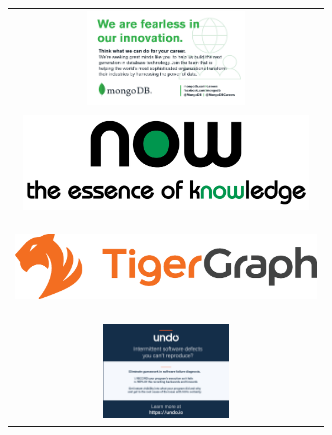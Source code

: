 \begin{tabular}{C{\linewidth}}
\includegraphics[height=25mm,width=80mm,keepaspectratio]{ads/mongodb.pdf} \\ 
\includegraphics[height=25mm,width=80mm,keepaspectratio]{ads/now.png}
\\ 
\includegraphics[height=25mm,width=80mm,keepaspectratio]{ads/tigergraph.eps}
\\ 
\includegraphics[height=25mm,width=80mm,keepaspectratio]{ads/undo.jpg}
\end{tabular}















